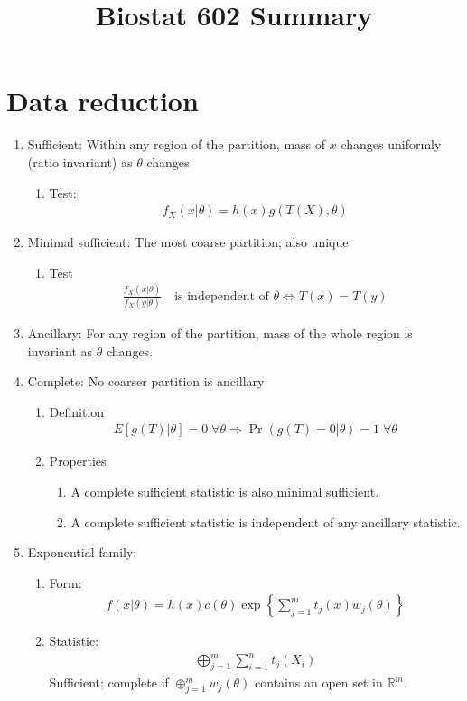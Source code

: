 \message{ !name(biostat602_summary.tex)}\documentclass{amsart}
\title{Biostat 602 Summary}
\begin{document}
\section{Data reduction}

\begin{enumerate}
\item Sufficient: Within any region of the partition, mass of $x$
  changes uniformly (ratio invariant) as $\theta$ changes
  \begin{enumerate}
  \item Test:
    \begin{align*}
      f_X(x|\theta) = h(x)g(T(X),\theta)
    \end{align*}
  \end{enumerate}
\item Minimal sufficient: The most coarse partition; also unique
  \begin{enumerate}
  \item Test
    \begin{align*}
      \frac{f_X(x|\theta)}{f_X(y|\theta)} \quad \text{is independent of $\theta$} 
      \Leftrightarrow T(x) = T(y)
    \end{align*}
  \end{enumerate}
\item Ancillary: For any region of the partition, mass of the whole
  region is invariant as $\theta$ changes.
\item Complete: No coarser partition is ancillary
  \begin{enumerate}
  \item Definition
    \begin{align*}
      E[g(T)|\theta] = 0 \; \forall \theta 
      \Rightarrow \operatorname{Pr}(g(T) = 0 | \theta) = 1 \; \forall \theta
    \end{align*}
  \item Properties
    \begin{enumerate}
    \item A complete sufficient statistic is also minimal sufficient.
    \item A complete sufficient statistic is independent of any
      ancillary statistic.
    \end{enumerate}
  \end{enumerate}
\item Exponential family:
  \begin{enumerate}
  \item Form:
    \begin{align*}
      f(x|\theta) = h(x) c(\theta) \exp{\left\{\sum_{j=1}^m t_j(x) w_j(\theta)\right\}}
    \end{align*}
  \item Statistic:
    \begin{align*}
      \bigoplus_{j=1}^m \sum_{i=1}^n t_j(X_i)
    \end{align*} 
    Sufficient; complete if $ \oplus_{j=1}^m w_j(\theta)$ contains an
    open set in $\mathbb{R}^m$.
  \end{enumerate}
     





\end{enumerate}
\end{document}
